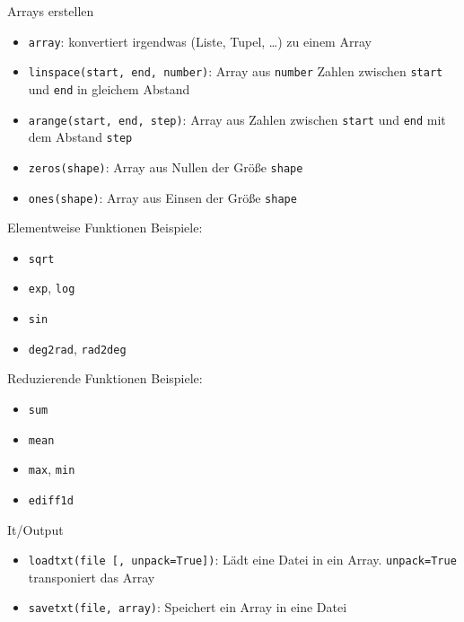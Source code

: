 \begin{frame}{Arrays erstellen}
  \begin{itemize}
    \item \texttt{array}: konvertiert irgendwas (Liste, Tupel, …) zu einem Array
    \item \texttt{linspace(start, end, number)}: Array aus \texttt{number} Zahlen zwischen \texttt{start} und \texttt{end} in gleichem Abstand
    \item \texttt{arange(start, end, step)}: Array aus Zahlen zwischen \texttt{start} und \texttt{end} mit dem Abstand \texttt{step}
    \item \texttt{zeros(shape)}: Array aus Nullen der Größe \texttt{shape}
    \item \texttt{ones(shape)}: Array aus Einsen der Größe \texttt{shape}
  \end{itemize}
\end{frame}

\begin{frame}{Elementweise Funktionen}
  Beispiele:
  \begin{itemize}
    \item \texttt{sqrt}
    \item \texttt{exp}, \texttt{log}
    \item \texttt{sin}
    \item \texttt{deg2rad}, \texttt{rad2deg}
  \end{itemize}
\end{frame}

\begin{frame}{Reduzierende Funktionen}
  Beispiele:
  \begin{itemize}
    \item \texttt{sum}
    \item \texttt{mean}
    \item \texttt{max}, \texttt{min}
    \item \texttt{ediff1d}
  \end{itemize}
\end{frame}

\begin{frame}{It/Output}
  \begin{itemize}
    \item \texttt{loadtxt(file [, unpack=True])}: Lädt eine Datei in ein Array.
      \texttt{unpack=True} transponiert das Array
    \item \texttt{savetxt(file, array)}: Speichert ein Array in eine Datei
  \end{itemize}
\end{frame}

